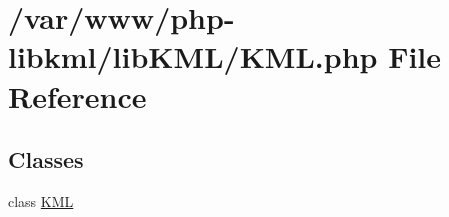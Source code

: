 \hypertarget{KML_8php}{
\section{/var/www/php-\/libkml/libKML/KML.php File Reference}
\label{d7/db0/KML_8php}
}
\subsection*{Classes}
\begin{DoxyCompactItemize}
\item 
class \hyperlink{classKML}{KML}
\end{DoxyCompactItemize}
